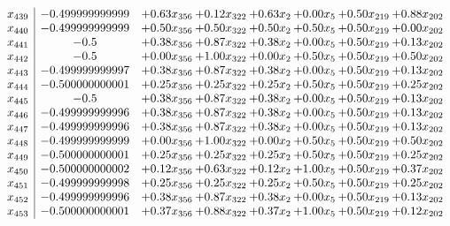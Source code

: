 \documentclass[8pt]{article}
\begin{document}
\[\begin{array}{c| c c@{\hskip 2pt} c@{\hskip 2pt} c@{\hskip 2pt} c@{\hskip 2pt} c@{\hskip 2pt} c@{\hskip 2pt} }
 x_{439}   &  -0.499999999999 & +  0.63 x_{356} & +  0.12 x_{322} & +  0.63 x_{2} & +  0.00 x_{5} & +  0.50 x_{219} & +  0.88 x_{202}\\
 x_{440}   &  -0.499999999999 & +  0.50 x_{356} & +  0.50 x_{322} & +  0.50 x_{2} & +  0.50 x_{5} & +  0.50 x_{219} & +  0.00 x_{202}\\
 x_{441}   &  -0.5 & +  0.38 x_{356} & +  0.87 x_{322} & +  0.38 x_{2} & +  0.00 x_{5} & +  0.50 x_{219} & +  0.13 x_{202}\\
 x_{442}   &  -0.5 & +  0.00 x_{356} & +  1.00 x_{322} & +  0.00 x_{2} & +  0.50 x_{5} & +  0.50 x_{219} & +  0.50 x_{202}\\
 x_{443}   &  -0.499999999997 & +  0.38 x_{356} & +  0.87 x_{322} & +  0.38 x_{2} & +  0.00 x_{5} & +  0.50 x_{219} & +  0.13 x_{202}\\
 x_{444}   &  -0.500000000001 & +  0.25 x_{356} & +  0.25 x_{322} & +  0.25 x_{2} & +  0.50 x_{5} & +  0.50 x_{219} & +  0.25 x_{202}\\
 x_{445}   &  -0.5 & +  0.38 x_{356} & +  0.87 x_{322} & +  0.38 x_{2} & +  0.00 x_{5} & +  0.50 x_{219} & +  0.13 x_{202}\\
 x_{446}   &  -0.499999999996 & +  0.38 x_{356} & +  0.87 x_{322} & +  0.38 x_{2} & +  0.00 x_{5} & +  0.50 x_{219} & +  0.13 x_{202}\\
 x_{447}   &  -0.499999999996 & +  0.38 x_{356} & +  0.87 x_{322} & +  0.38 x_{2} & +  0.00 x_{5} & +  0.50 x_{219} & +  0.13 x_{202}\\
 x_{448}   &  -0.499999999999 & +  0.00 x_{356} & +  1.00 x_{322} & +  0.00 x_{2} & +  0.50 x_{5} & +  0.50 x_{219} & +  0.50 x_{202}\\
 x_{449}   &  -0.500000000001 & +  0.25 x_{356} & +  0.25 x_{322} & +  0.25 x_{2} & +  0.50 x_{5} & +  0.50 x_{219} & +  0.25 x_{202}\\
 x_{450}   &  -0.500000000002 & +  0.12 x_{356} & +  0.63 x_{322} & +  0.12 x_{2} & +  1.00 x_{5} & +  0.50 x_{219} & +  0.37 x_{202}\\
 x_{451}   &  -0.499999999998 & +  0.25 x_{356} & +  0.25 x_{322} & +  0.25 x_{2} & +  0.50 x_{5} & +  0.50 x_{219} & +  0.25 x_{202}\\
 x_{452}   &  -0.499999999996 & +  0.38 x_{356} & +  0.87 x_{322} & +  0.38 x_{2} & +  0.00 x_{5} & +  0.50 x_{219} & +  0.13 x_{202}\\
 x_{453}   &  -0.500000000001 & +  0.37 x_{356} & +  0.88 x_{322} & +  0.37 x_{2} & +  1.00 x_{5} & +  0.50 x_{219} & +  0.12 x_{202}\\

\end{array}\]
\end{document}
